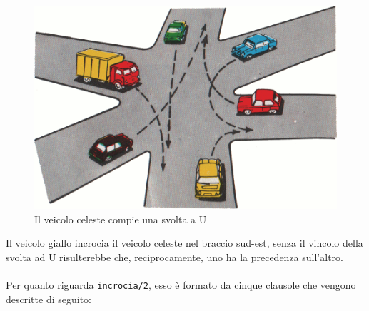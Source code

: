 \begin{figure}[!htb]
	\centering
	\includegraphics[width=.5\textwidth]{images/movement/uturn}
	\caption{Il veicolo celeste compie una svolta a U}
\end{figure}

Il veicolo giallo incrocia il veicolo celeste nel braccio sud-est, senza il vincolo della svolta ad U risulterebbe che, reciprocamente, uno ha la precedenza sull'altro.
\\\\
\indent Per quanto riguarda \texttt{incrocia/2}, esso è formato da cinque clausole che vengono descritte di seguito:
